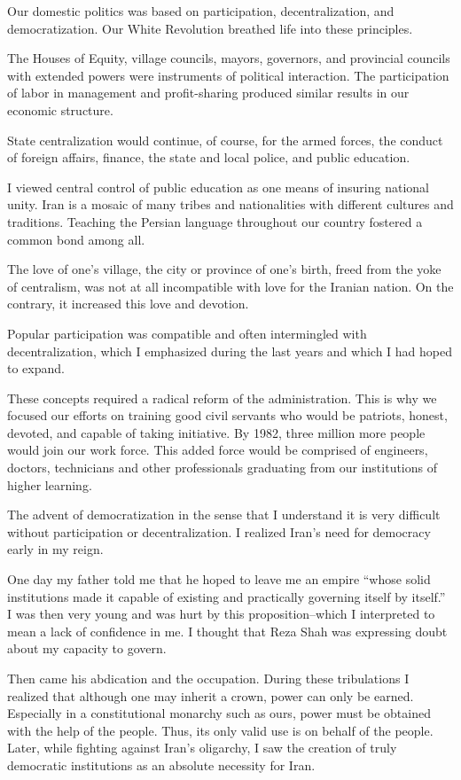 Our domestic politics was based on participation, decentralization, and democratization. Our White Revolution breathed life into these principles. 

The Houses of Equity, village councils, mayors, governors, and provincial councils with extended powers were instruments of political interaction. The participation of labor in management and profit-sharing produced similar results in our economic structure. 

State centralization would continue, of course, for the armed forces, the conduct of foreign affairs, finance, the state and local police, and public education. 

I viewed central control of public education as one means of insuring national unity. Iran is a mosaic of many tribes and nationalities with different cultures and traditions. Teaching the Persian language throughout our country fostered a common bond among all. 

The love of one’s village, the city or province of one’s birth, freed from the yoke of centralism, was not at all incompatible with love for the Iranian nation. On the contrary, it increased this love and devotion. 

Popular participation was compatible and often intermingled with decentralization, which I emphasized during the last years and which I had hoped to expand. 

These concepts required a radical reform of the administration. This is why we focused our efforts on training good civil servants who would be patriots, honest, devoted, and capable of taking initiative. By 1982, three million more people would join our work force. This added force would be comprised of engineers, doctors, technicians and other professionals graduating from our institutions of higher learning. 

The advent of democratization in the sense that I understand it is very difficult without participation or decentralization. I realized Iran's need for democracy early in my reign. 

One day my father told me that he hoped to leave me an empire “whose solid institutions made it capable of existing and practically governing itself by itself.” I was then very young and was hurt by this proposition--which I interpreted to mean a lack of confidence in me. I thought that Reza Shah was expressing doubt about my capacity to govern. 


Then came his abdication and the occupation. During these tribulations I realized that although one may inherit a crown, power can only be earned. Especially in a constitutional monarchy such as ours, power must be obtained with the help of the people. Thus, its only valid use is on behalf of the people. Later, while fighting against Iran’s oligarchy, I saw the creation of truly democratic institutions as an absolute necessity for Iran. 


